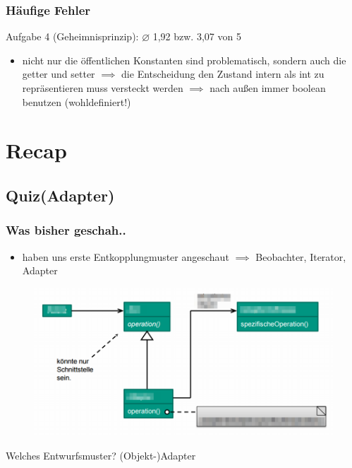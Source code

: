 \documentclass[18pt]{beamer}
\begin{document}
	\begin{frame}
		\frametitle{Häufige Fehler}
		\begin{block}{Aufgabe 4 (Geheimnisprinzip): $\diameter$ 1,92 bzw. 3,07 von 5}
			\begin{itemize}
				\pause
				\item nicht nur die öffentlichen Konstanten sind problematisch, sondern auch die getter und setter \pause
				\linebreak $\implies$ die Entscheidung den Zustand intern als int zu repräsentieren muss versteckt werden \pause 
				\linebreak $\implies$ nach außen immer boolean benutzen (wohldefiniert!)
			\end{itemize}
		\end{block}
	\end{frame}

\section{Recap}
	\subsection{Quiz(Adapter)}
	\begin{frame}
		\frametitle{Was bisher geschah..}
		\begin{itemize}
			\item haben uns erste Entkopplungmuster angeschaut \pause
			\linebreak $\implies$ Beobachter, Iterator, Adapter \pause
		\end{itemize}
		\begin{figure}
			\includegraphics[scale=0.33]{./pics/tut4/adap-obj-mod.png}
		\end{figure}
		Welches Entwurfsmuster? \pause (Objekt-)Adapter
	\end{frame}
	
\end{document}
